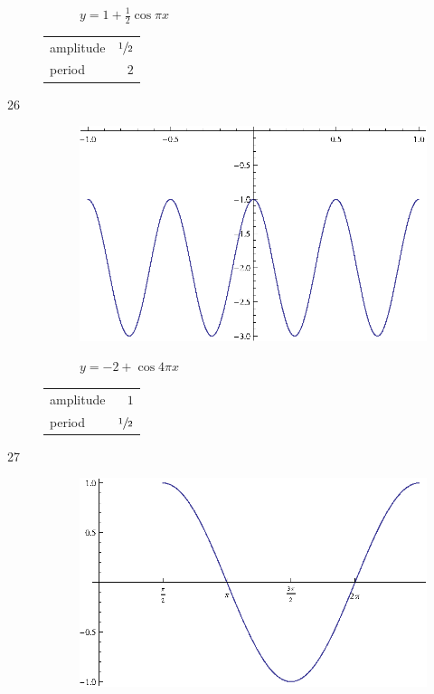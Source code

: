 \documentclass{exam}
\begin{document}
\begin{description}
\begin{figure}[H]
          $y = 1 + \frac{1}{2} \cos \pi x$
        \end{figure}

        \begin{tabular}[H]{lr}
          \toprule
          amplitude & $\sfrac{1}{2}$ \\
          period    & $2$ \\
          \bottomrule
        \end{tabular}

      \item[26]
        \begin{figure}[H]
          \centering
          \includegraphics[scale=0.9]{exercise26.eps}

          $y = -2 + \cos 4 \pi x$
        \end{figure}

        \begin{tabular}[H]{lr}
          \toprule
          amplitude & $1$ \\
          period    & $\sfrac{1}{2}$ \\
          \bottomrule
        \end{tabular}

      \item[27]
        \begin{figure}[H]
          \centering
          \includegraphics[scale=0.8]{exercise27.eps}


\end{figure}
\end{description}
\end{document}
